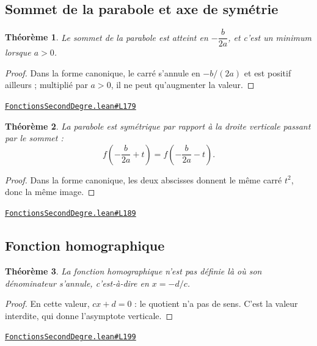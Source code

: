 \documentclass[11pt,a4paper]{article}
\theoremstyle{definition}
\theoremstyle{plain}
\newtheorem{theoreme}{Théorème}
\newcommand{\source}[2]{\par\smallskip\noindent\hfill{\footnotesize\href{#1}{\texttt{#2}}}\par\smallskip}
\begin{document}
\subsection{Sommet de la parabole et axe de symétrie}

\begin{theoreme}
Le sommet de la parabole est atteint en $-\dfrac{b}{2a}$, et c'est un minimum lorsque
$a > 0$.
\end{theoreme}

\begin{proof}
Dans la forme canonique, le carré s'annule en $-b/(2a)$ et est positif ailleurs ;
multiplié par $a > 0$, il ne peut qu'augmenter la valeur.
\end{proof}
\source{https://github.com/Commutator-IO/learn-lean/blob/main/courses/02-lycee/02-fonctions-second-degre/FonctionsSecondDegre.lean\#L179}{FonctionsSecondDegre.lean\#L179}

\begin{theoreme}
La parabole est symétrique par rapport à la droite verticale passant par le sommet :
\[ f\left(-\frac{b}{2a} + t\right) = f\left(-\frac{b}{2a} - t\right) . \]
\end{theoreme}

\begin{proof}
Dans la forme canonique, les deux abscisses donnent le même carré $t^2$, donc la même
image.
\end{proof}
\source{https://github.com/Commutator-IO/learn-lean/blob/main/courses/02-lycee/02-fonctions-second-degre/FonctionsSecondDegre.lean\#L189}{FonctionsSecondDegre.lean\#L189}

\subsection{Fonction homographique}

\begin{theoreme}
La fonction homographique n'est pas définie là où son dénominateur s'annule, c'est-à-dire
en $x = -d/c$.
\end{theoreme}

\begin{proof}
En cette valeur, $cx + d = 0$ : le quotient n'a pas de sens. C'est la valeur interdite,
qui donne l'asymptote verticale.
\end{proof}
\source{https://github.com/Commutator-IO/learn-lean/blob/main/courses/02-lycee/02-fonctions-second-degre/FonctionsSecondDegre.lean\#L199}{FonctionsSecondDegre.lean\#L199}
\end{document}
